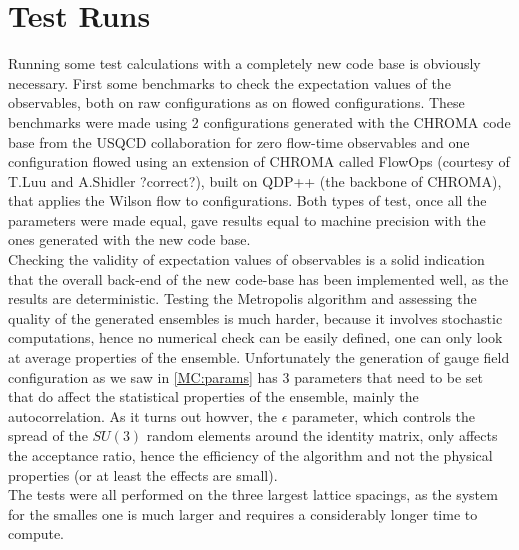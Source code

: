 \section{Test Runs}
\label{sec:testautocorr}
Running some test calculations with a completely new code base is obviously necessary. First some benchmarks to check the expectation values of the observables, both on raw configurations as on flowed configurations. These benchmarks were made using 2 configurations generated with the CHROMA \cite{edwards_chroma_2005} code base from the USQCD collaboration for zero flow-time observables and one configuration flowed using an extension of CHROMA called FlowOps (courtesy of T.Luu and A.Shidler ?correct?), built on QDP++ (the backbone of CHROMA), that applies the Wilson flow to configurations. Both types of test, once all the parameters were made equal, gave results equal to machine precision with the ones generated with the new code base.\\
Checking the validity of expectation values of observables is a solid indication that the overall back-end of the new code-base has been implemented well, as the results are deterministic. Testing the Metropolis algorithm and assessing the quality of the generated ensembles is much harder, because it involves stochastic computations, hence no numerical check can be easily defined, one can only look at average properties of the ensemble. Unfortunately the generation of gauge field configuration as we saw in \cref{MC:params} has 3 parameters that need to be set that do affect the statistical properties of the ensemble, mainly the autocorrelation. As it turns out howver, the $\epsilon$ parameter, which controls the spread of the $SU(3)$ random elements around the identity matrix, only affects the acceptance ratio, hence the efficiency of the algorithm and not the physical properties (or at least the effects are small).\\
The tests were all performed on the three largest lattice spacings, as the system for the smalles one is much larger and requires a considerably longer time to compute.

